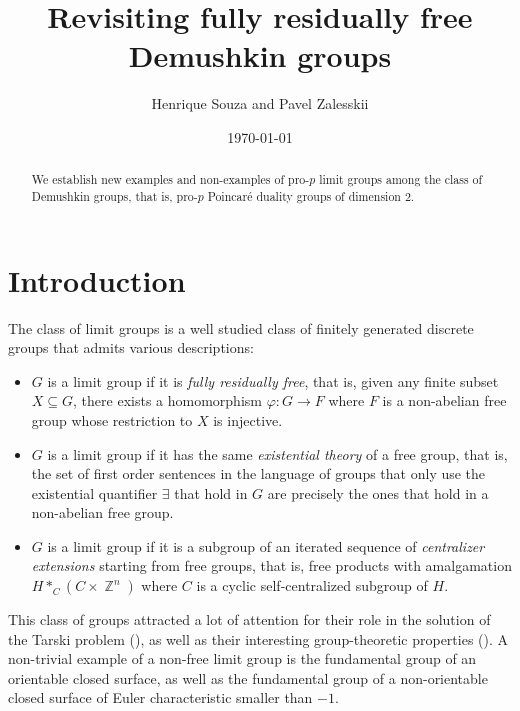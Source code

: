\documentclass[a4paper]{amsart}
\title{Revisiting fully residually free Demushkin groups}
\author{Henrique Souza and Pavel Zalesskii}
\date{\today}
\DeclareMathOperator{\bbz}{\mathbb{Z}}
\theoremstyle{definition}
\begin{document}
\begin{abstract}
    We establish new examples and non-examples of pro-\(p\) limit groups among the class of Demushkin groups, that is, pro-\(p\) Poincaré duality groups of dimension \(2\).
\end{abstract}

\maketitle

\section{Introduction}

The class of limit groups is a well studied class of finitely generated discrete groups that admits various descriptions:
\begin{itemize}
    \item \(G\) is a limit group if it is \emph{fully residually free}, that is, given any finite subset \(X \subseteq G\), there exists a homomorphism \(\varphi\colon G \to F\) where \(F\) is a non-abelian free group whose restriction to \(X\) is injective.
    \item \(G\) is a limit group if it has the same \emph{existential theory} of a free group, that is, the set of first order sentences in the language of groups that only use the existential quantifier \(\exists\) that hold in \(G\) are precisely the ones that hold in a non-abelian free group.
    \item \(G\) is a limit group if it is a subgroup of an iterated sequence of \emph{centralizer extensions} starting from free groups, that is, free products with amalgamation \(H *_C (C \times \bbz^n)\) where \(C\) is a cyclic self-centralized subgroup of \(H\).
\end{itemize}
This class of groups attracted a lot of attention for their role in the solution of the Tarski problem (\cite{kharlampovichElementaryTheoryFree2006,selaDiophantineGeometryGroups2006}), as well as their interesting group-theoretic properties (\cite[Prop. 1.1]{alibegovicLimitGroupsAre2006}). A non-trivial example of a non-free limit group is the fundamental group of an orientable closed surface, as well as the fundamental group of a non-orientable closed surface of Euler characteristic smaller than \(-1\).
\end{document}
